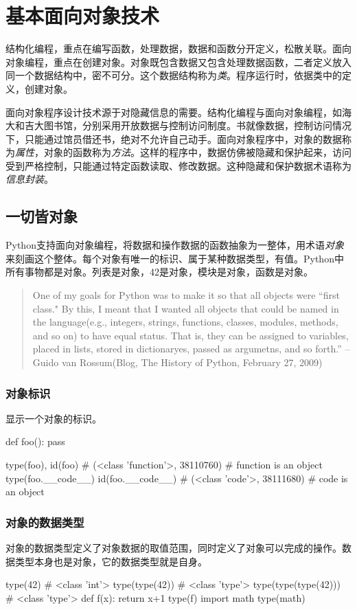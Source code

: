 \chapter{基本面向对象技术}
结构化编程，重点在编写函数，处理数据，数据和函数分开定义，松散关联。面向对象编程，重点在创建对象。对象既包含数据又包含处理数据函数，二者定义放入同一个数据结构中，密不可分。这个数据结构称为\emph{类}。程序运行时，依据类中的定义，创建对象。

面向对象程序设计技术源于对隐藏信息的需要。结构化编程与面向对象编程，如海大和吉大图书馆，分别采用开放数据与控制访问制度。书就像数据，控制访问情况下，只能通过馆员借还书，绝对不允许自己动手。面向对象程序中，对象的数据称为\emph{属性}，对象的函数称为\emph{方法}。这样的程序中，数据仿佛被隐藏和保护起来，访问受到严格控制，只能通过特定函数读取、修改数据。这种隐藏和保护数据术语称为\emph{信息封装}。

\section{一切皆对象}
Python支持面向对象编程，将数据和操作数据的函数抽象为一整体，用术语\emph{对象}来刻画这个整体。每个对象有唯一的标识、属于某种数据类型，有值。Python中所有事物都是对象。列表是对象，42是对象，模块是对象，函数是对象。
\begin{quotation}
  One of my goals for Python was to make it so that all objects were ``first class."  By this, I meant that I wanted all objects that could be named in the language(e.g., integers, strings, functions, classes, modules, methods, and so on) to have equal status. That is, they can be assigned to variables, placed in lists, stored in dictionaryes, passed as argumetns, and so forth.''
  --Guido van Rossum(Blog, The History of Python, February 27, 2009)
\end{quotation}
\subsection{对象标识}
显示一个对象的标识。
\begin{python}
def foo(): pass

type(foo), id(foo)
# (<class 'function'>, 38110760)   #  function is an object
type(foo.__code__)
id(foo.__code__)
# (<class 'code'>, 38111680)  #  code is an object
\end{python}
\subsection{对象的数据类型}
对象的数据类型定义了对象数据的取值范围，同时定义了对象可以完成的操作。数据类型本身也是对象，它的数据类型就是自身。
\begin{python}
type(42)
#  <class 'int'>
type(type(42))
#  <class 'type'>
type(type(type(42)))
#  <class 'type'>
def f(x):
    return x+1
type(f)
import math
type(math)
\end{python}


